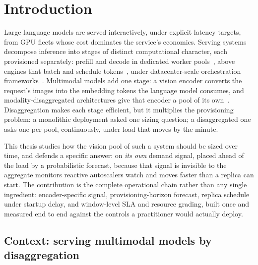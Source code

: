 \chapter{Introduction}
\label{cap:intro}

Large language models are served interactively, under explicit latency
targets, from GPU fleets whose cost dominates the service's economics.
Serving systems decompose inference into stages of distinct computational
character, each provisioned separately: prefill and decode in dedicated
worker pools~\cite{Zhong2024DistServe,Patel2024Splitwise,Qin2025Mooncake},
above engines that batch and schedule
tokens~\cite{Kwon2023vLLM,Agrawal2024SarathiServe}, under datacenter-scale
orchestration frameworks~\cite{Dynamo2025}. Multimodal models add one stage:
a vision encoder converts the request's images into the embedding tokens the
language model consumes, and modality-disaggregated architectures give that
encoder a pool of its own~\cite{Qiu2025ModServe}. Disaggregation makes each
stage efficient, but it multiplies the provisioning problem: a monolithic
deployment asked one sizing question; a disaggregated one asks one per pool,
continuously, under load that moves by the minute.

This thesis studies how the vision pool of such a system should be sized
over time, and defends a specific answer: on \emph{its own} demand signal,
placed ahead of the load by a probabilistic forecast, because that signal is
invisible to the aggregate monitors reactive autoscalers watch and moves
faster than a replica can start. The
contribution is the complete operational chain rather than any single
ingredient: encoder-specific signal, provisioning-horizon forecast, replica
schedule under startup delay, and window-level SLA and resource grading,
built once and measured end to end against the controls a practitioner would
actually deploy.

\section{Context: serving multimodal models by disaggregation}
\label{sec:intro-context}

